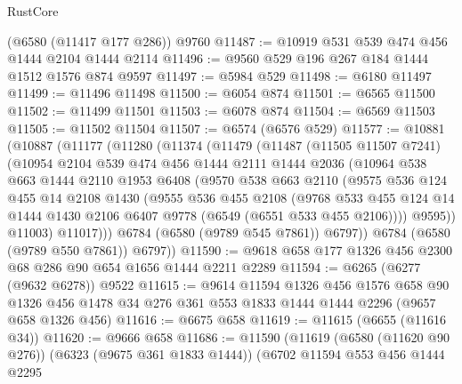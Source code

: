 \begin{lexlean}{RustCore}
\begin{coremodule}
    (@6580 (@11417 @177 @286))
    @9760
@11487 := @10919 @531 @539 @474 @456 @1444 @2104 @1444 @2114
@11496 := @9560 @529 @196 @267 @184 @1444 @1512 @1576 @874 @9597
@11497 := @5984 @529
@11498 := @6180 @11497
@11499 := @11496 @11498
@11500 := @6054 @874
@11501 := @6565 @11500
@11502 := @11499 @11501
@11503 := @6078 @874
@11504 := @6569 @11503
@11505 := @11502 @11504
@11507 := @6574 (@6576 @529)
@11577 := @10881
    (@10887
      (@11177
        (@11280
          (@11374
            (@11479
              (@11487
                (@11505 @11507 @7241)
                (@10954
                  @2104
                  @539
                  @474
                  @456
                  @1444
                  @2111
                  @1444
                  @2036
                  (@10964
                    @538
                    @663
                    @1444
                    @2110
                    @1953
                    @6408
                    (@9570
                      @538
                      @663
                      @2110
                      (@9575
                        @536
                        @124
                        @455
                        @14
                        @2108
                        @1430
                        (@9555
                          @536
                          @455
                          @2108
                          (@9768
                            @533
                            @455
                            @124
                            @14
                            @1444
                            @1430
                            @2106
                            @6407
                            @9778
                            (@6549 (@6551 @533 @455 @2106))))
                        @9595))
                    @11003)
                  @11017)))
            @6784
            (@6580 (@9789 @545 @7861))
            @6797))
        @6784
        (@6580 (@9789 @550 @7861))
        @6797))
@11590 := @9618 @658 @177 @1326 @456 @2300 @68 @286 @90 @654 @1656 @1444 @2211 @2289
@11594 := @6265 (@6277 (@9632 @6278)) @9522
@11615 := @9614
    @11594
    @1326
    @456
    @1576
    @658
    @90
    @1326
    @456
    @1478
    @34
    @276
    @361
    @553
    @1833
    @1444
    @1444
    @2296
    (@9657 @658 @1326 @456)
@11616 := @6675 @658
@11619 := @11615 (@6655 (@11616 @34))
@11620 := @9666 @658
@11686 := @11590
    (@11619
      (@6580 (@11620 @90 @276))
      (@6323 (@9675 @361 @1833 @1444))
      (@6702
        @11594
        @553
        @456
        @1444
        @2295

\end{coremodule}
\end{lexlean}
